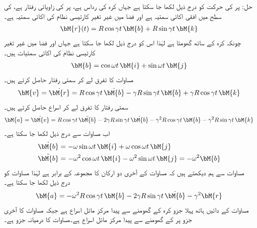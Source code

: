 حل: پر  کی حرکت کو درج ذیل لکھا جا سکتا ہے جہاں کرہ کی رداس  ہے،  پر  کی زاویائی رفتار  ہے،   کی سطح میں  افقی اکائی سمتیہ ہے اور  فضا میں غیر تغیر کارتیسی نظام کی اکائی سمتیہ ہے۔
\begin{align}\label{مساوات_الاحصاء_دو_گردش_الف}
\bM{r}(t)=R\cos \gamma t\,\bM{b}+R\sin \gamma t\,\bM{k}
\end{align}
چونکہ  کرہ کے ساتھ گھومتا ہے لہٰذا اس کو درج ذیل لکھا جا سکتا ہے جہاں  اور  فضا میں غیر تغیر کارتیسی نظام کی اکائی سمتیات ہیں۔
\begin{align}\label{مساوات_الاحصاء_دو_گردش_ب}
\bM{b}=\cos \omega t\,\bM{i}+\sin \omega t\,\bM{j}
\end{align}
مساوات  کا تفرق لے کر سمتی رفتار حاصل کرتے ہیں۔
\begin{align}\label{مساوات_الاحصاء_دو_گردش_پ}
\bM{v}=\dot{\bM{r}}=R\cos \gamma t \, \dot{\bM{b}}-\gamma R\sin \gamma t \, \bM{b}+\gamma R\cos \gamma t\,\bM{k}
\end{align}
سمتی رفتار کا تفرق لے کر اسراع حاصل کرتے ہیں۔
\begin{align}\label{مساوات_الاحصاء_دو_گردش_ت}
\bM{a}=\dot{\bM{v}}=R\cos \gamma t \,\ddot{\bM{b}}-2\gamma R\sin \gamma t\,\dot{\bM{b}}-\gamma^2 R\cos \gamma t\,\bM{b}-\gamma^2 R \sin \gamma t\,\bM{k}
\end{align}
اب مساوات  سے درج ذیل لکھا جا سکتا ہے۔
\begin{align*}
\dot{\bM{b}}&=-\omega \sin \omega t\,\bM{i}+\omega \cos \omega t\,\bM{j}\\
\ddot{\bM{b}}&=-\omega^2\cos \omega t\,\bM{i}-\omega^2\sin \omega t\,\bM{j}=-\omega^2\bM{b}
\end{align*}
مساوات  سے ہم دیکھتے ہیں کہ مساوات   کے آخری دو ارکان کا مجموعہ  کے برابر ہے لہٰذا مساوات  کو درج ذیل لکھا جا سکتا ہے۔
\begin{align}\label{مساوات_الاحصاء_دو_گردش_ٹ}
\bM{a}=-\omega^2R\cos \gamma t\,\bM{b}-2\gamma R\sin \gamma t \,\dot{\bM{b}}-\gamma^2\bM{r}
\end{align}
مساوات  کے دائیں ہاتھ پہلا جزو کرہ کے گھومنے سے پیدا مرکز مائل اسراع ہے جبکہ مساوات کا آخری جزو  پر  کے گھومنے  سے پیدا مرکز مائل اسراع ہے۔مساوات کا درمیانہ جزو     ہے۔
